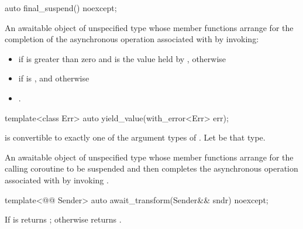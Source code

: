 %
\begin{itemdecl}
auto final_suspend() noexcept;
\end{itemdecl}
\begin{itemdescr}
\pnum
\returns
An awaitable object of unspecified type whose
member functions arrange for the completion of the asynchronous
operation associated with  by invoking:
\begin{itemize}
\item
{}
if  is greater than zero and
 is the value held by , otherwise
\item
{} if  is ,
and otherwise
\item
 .
\end{itemize}
\end{itemdescr}

%
\begin{itemdecl}
template<class Err>
  auto yield_value(with_error<Err> err);
\end{itemdecl}
\begin{itemdescr}
\pnum
\mandates
{} is convertible to exactly one of the
 argument types of .
Let  be that type.

\pnum
\returns
An awaitable object of unspecified type whose
member functions arrange for the calling coroutine to be suspended
and then completes the asynchronous operation associated with
 by invoking .
\end{itemdescr}

%
\begin{itemdecl}
template<@@ Sender>
  auto await_transform(Sender&& sndr) noexcept;
\end{itemdecl}
\begin{itemdescr}
\pnum
\returns
If  is 
returns ;
otherwise returns
.
\end{itemdescr}

